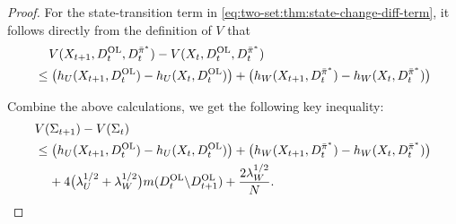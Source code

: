\documentclass[11pt,letterpaper]{article}
\theoremstyle{plain}
\theoremstyle{definition}
\theoremstyle{remark}
\newcommand{\pibar}{{\sysbar{\pi}}}
\newcommand{\pibs}{{\pibar^*}}
\newcommand{\sysbar}[1]{\bar{#1}}
\newcommand{\wmat}{W}
\newcommand{\umat}{U}
\newcommand{\hw}{h_\wmat}
\newcommand{\hu}{h_\umat}
\newcommand{\lamw}{\lambda_\wmat}
\newcommand{\lamu}{\lambda_\umat}
\newcommand{\Da}{D^{\pibs}}
\newcommand{\Db}{D^{\textup{OL}}}
\newcommand{\Fullstate}{\Sigma}
\begin{document}
\begin{proof}
For the state-transition term in \eqref{eq:two-set:thm:state-change-diff-term}, it follows directly from the definition of $V$ that 
\begin{align}
    \nonumber
     &\mspace{20mu} V(X_{t+1}, \Db_{t}, \Da_{t}) -  V(X_{t}, \Db_{t}, \Da_{t})\\
     \label{eq:two-set:thm:state-transition-term-1}
     &\leq \big(\hu(X_{t+1}, \Db_t) - \hu(X_{t}, \Db_t)\big)+ \big(\hw(X_{t+1}, \Da_t) - \hw(X_{t}, \Da_t)\big)
\end{align}


Combine the above calculations, we get the following key inequality:
\begin{align}
    \nonumber
    & V(\Fullstate_{t+1}) - V(\Fullstate_t) \\
    \label{eq:two-set:thm:v-diff-term-1}
    &\leq \big(\hu(X_{t+1}, \Db_t) - \hu(X_{t}, \Db_t)\big)+ \big(\hw(X_{t+1}, \Da_t) - \hw(X_{t}, \Da_t)\big)\\
    \label{eq:two-set:thm:v-diff-term-2}
    &\mspace{20mu} + 4\big(\lamu^{1/2} + \lamw^{1/2}\big) m(\Db_t \backslash \Db_{t+1}) + \frac{2\lamw^{1/2}}{N}. 
\end{align}



\end{proof}
\end{document}
